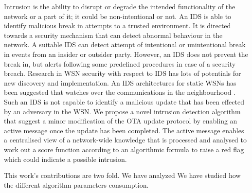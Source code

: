 \documentclass[conference,man]{IEEEtran}
\begin{document}



Intrusion is the ability to disrupt or degrade the intended functionality of the network or a part of it; it could be non-intentional or not.
An IDS is able to identify malicious break in attempts  to a trusted environment.
It is directed towards a security mechanism that can detect abnormal behaviour in the network.
A suitable IDS can detect attempt of intentional or unintentional break in events from an insider or outsider party.
However, an IDS does not prevent the break in, but alerts following some predefined procedures in case of a security breach.
Research in WSN security with respect to IDS has lots of potentials for new discovery and implementation.
An IDS architectures for static WSNs has been suggested that watches over the communications in the neighbourhood \cite{roman2006applying}.
Such an IDS is not capable to identify a malicious update that has been effected by an adversary in the WSN.
We propose a novel intrusion detection algorithm that suggest a minor modification of the OTA update protocol by enabling an active message once the update has been completed.
The active message enables a centralised view of a network-wide knowledge  that is processed and analysed to work out a score function according to an algorithmic formula to raise a red flag which could indicate a possible intrusion.



This work's contributions are two fold. 
We have analyzed 
We have studied how the different  algorithm parameters %
consumption. 







\end{document}
